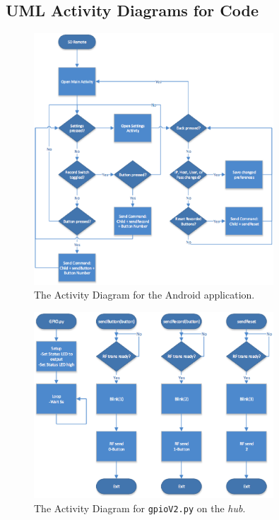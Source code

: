 \documentclass[12pt]{article}
\begin{document}
\clearpage

\subsection*{UML Activity Diagrams for Code}
\begin{figure}[ht!]
\centering %
\includegraphics[width=0.8\textwidth]{AD-SDR.eps} 
\caption{The Activity Diagram for the Android application.} \label{ad-sdr}
\end{figure}

\begin{figure}[ht!]
\centering %
\includegraphics[width=0.8\textwidth]{AD-gpio.eps} 
\caption{The Activity Diagram for \texttt{gpioV2.py} on the \emph{hub}.} \label{ad-gpio}
\end{figure}
\end{document}
